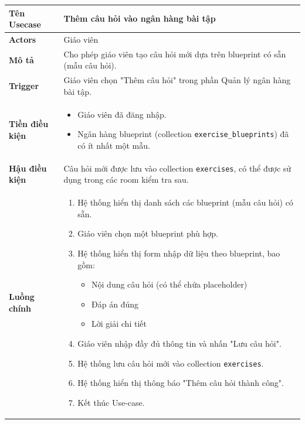 \begin{longtable}{|p{}|p{}|}
\hline
\textbf{Tên Usecase} & \textbf{Thêm câu hỏi vào ngân hàng bài tập} \\
\hline
\textbf{Actors} & Giáo viên \\
\hline
\textbf{Mô tả} & 
Cho phép giáo viên tạo câu hỏi mới dựa trên blueprint có sẵn (mẫu câu hỏi). \\
\hline
\textbf{Trigger} & Giáo viên chọn "Thêm câu hỏi" trong phần Quản lý ngân hàng bài tập. \\
\hline
\textbf{Tiền điều kiện} & 
\vspace{-\baselineskip}
\begin{itemize}[topsep=2pt, itemsep=0pt]
    \item Giáo viên đã đăng nhập.
    \item Ngân hàng blueprint (collection \texttt{exercise\_blueprints}) đã có ít nhất một mẫu.
\end{itemize} \\
\hline
\textbf{Hậu điều kiện} & Câu hỏi mới được lưu vào collection \texttt{exercises}, có thể được sử dụng trong các room kiểm tra sau. \\
\hline
\textbf{Luồng chính} &
\vspace{-\baselineskip}
\begin{enumerate}[topsep=2pt, itemsep=0pt]
    \item Hệ thống hiển thị danh sách các blueprint (mẫu câu hỏi) có sẵn.
    \item Giáo viên chọn một blueprint phù hợp.
    \item Hệ thống hiển thị form nhập dữ liệu theo blueprint, bao gồm:
    \begin{itemize}[topsep=0pt, itemsep=0pt]
        \item Nội dung câu hỏi (có thể chứa placeholder)
        \item Đáp án đúng
        \item Lời giải chi tiết
    \end{itemize}
    \item Giáo viên nhập đầy đủ thông tin và nhấn "Lưu câu hỏi".
    \item Hệ thống lưu câu hỏi mới vào collection \texttt{exercises}.
    \item Hệ thống hiển thị thông báo "Thêm câu hỏi thành công".
    \item Kết thúc Use-case.
\end{enumerate} \\
\hline

\end{longtable}
